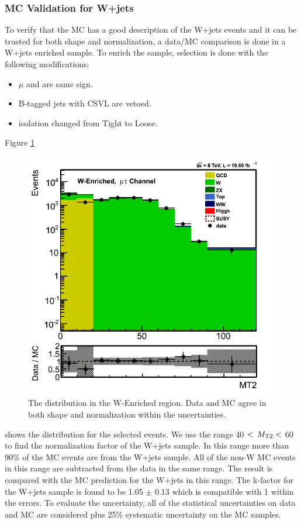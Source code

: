 \subsubsection{MC Validation for W+jets}
To verify that the MC has a good description of the W+jets events and it can be trusted for both shape and normalization, a data/MC comparison 
is done in a W+jets enriched sample. To enrich the sample, \muTau selection is done with the following modifications:
\begin{itemize}
\item $\mu$ and \Tau are same sign.
\item B-tagged jets with CSVL are vetoed.
\item \Tau isolation changed from Tight to Loose.
\end{itemize}
Figure \ref{fig:mt2_WValidation} 
\begin{figure}[htbp]
\centering
\includegraphics[angle=0,scale=0.35]{TauTauFigs/MT2_WValidation.png}
\caption{The \mttwo distribution in the W-Enriched region. Data and MC agree in both shape and normalization within the uncertainties.}
\label{fig:mt2_WValidation}
\end{figure}
shows the \mttwo distribution for the selected events. We use the range 40 $<\,{M_{\rm T2}}<$ 60 \GeV to find the normalization factor of the 
W+jets sample. In this range more than 90\% of the MC events are from the W+jets sample. 
All of the non-W MC events in this range are subtracted from 
the data in the same range. The result is compared with the MC prediction for the W+jets in this range. The k-factor for the W+jets sample is 
found to be 1.05 $\pm$ 0.13 which is compatible with 1 within the errors. To evaluate the uncertainty, all of the statistical uncertainties on data 
and MC are considered plus 25\% systematic uncertainty on the MC samples.

